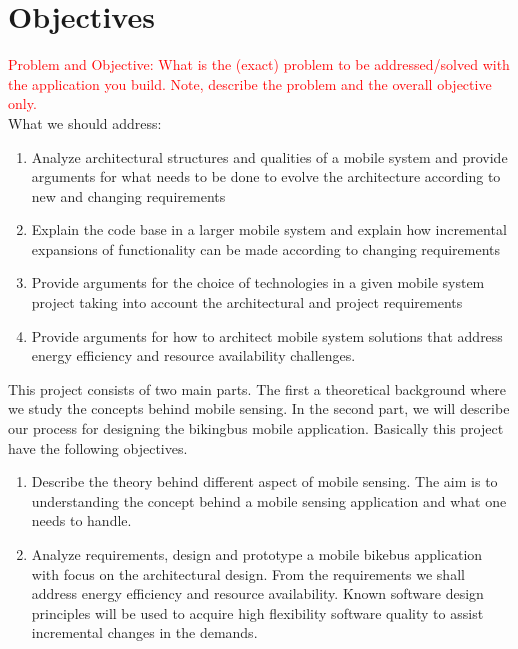 \section{Objectives}
\textcolor{red}{Problem and Objective: What is the (exact) problem to be addressed/solved with the application you build. Note, describe the problem and the overall objective only.}\\

\noindent
What we should address:
\begin{enumerate}
    \item  Analyze architectural structures and qualities of a mobile system and provide arguments for what needs to be done to evolve the architecture according to new and changing requirements
            
    \item  Explain the code base in a larger mobile system and explain how incremental expansions of functionality can be made according to changing requirements
    
    \item   Provide arguments for the choice of technologies in a given mobile system project taking into account the architectural and project requirements
    
    \item Provide arguments for how to architect mobile system solutions that address energy efficiency and resource availability challenges. 
\end{enumerate}








\noindent
This project consists of two main parts. The first a theoretical background where we study the concepts behind mobile sensing. In the second part, we will describe our process for designing the bikingbus mobile application. Basically this project have the following objectives. 

\begin{enumerate}
    \item   Describe the theory behind different aspect of mobile sensing. The aim is to understanding the concept behind a mobile sensing application and what one needs to handle. 
            
    \item  Analyze requirements, design and prototype a mobile bikebus application with focus on the architectural design. From the requirements we shall address energy efficiency and resource availability. Known software design principles will be used to acquire high flexibility software quality to assist incremental changes in the demands. 

\end{enumerate}


